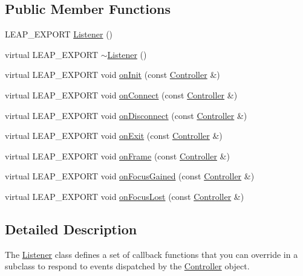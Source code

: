 \subsection*{Public Member Functions}
\begin{DoxyCompactItemize}
\item 
L\+E\+A\+P\+\_\+\+E\+X\+P\+O\+R\+T \hyperlink{class_leap_1_1_listener_a68f2cc4c80510c7f0bb47d1f576ffea9}{Listener} ()
\item 
virtual L\+E\+A\+P\+\_\+\+E\+X\+P\+O\+R\+T \hyperlink{class_leap_1_1_listener_a11a24ce72b609c45ec7010a3cb460d49}{$\sim$\+Listener} ()
\item 
virtual L\+E\+A\+P\+\_\+\+E\+X\+P\+O\+R\+T void \hyperlink{class_leap_1_1_listener_a180d621ad08afa5851d03d3546a82bbf}{on\+Init} (const \hyperlink{class_leap_1_1_controller}{Controller} \&)
\item 
virtual L\+E\+A\+P\+\_\+\+E\+X\+P\+O\+R\+T void \hyperlink{class_leap_1_1_listener_adfef79f9a03b342384aaa17f3a8ebf15}{on\+Connect} (const \hyperlink{class_leap_1_1_controller}{Controller} \&)
\item 
virtual L\+E\+A\+P\+\_\+\+E\+X\+P\+O\+R\+T void \hyperlink{class_leap_1_1_listener_ac031e2d95b530097e2060518a9190f5e}{on\+Disconnect} (const \hyperlink{class_leap_1_1_controller}{Controller} \&)
\item 
virtual L\+E\+A\+P\+\_\+\+E\+X\+P\+O\+R\+T void \hyperlink{class_leap_1_1_listener_ac8f779a9208101f0084953560923f88c}{on\+Exit} (const \hyperlink{class_leap_1_1_controller}{Controller} \&)
\item 
virtual L\+E\+A\+P\+\_\+\+E\+X\+P\+O\+R\+T void \hyperlink{class_leap_1_1_listener_ab600421108bbc952d8f0f144384ca30f}{on\+Frame} (const \hyperlink{class_leap_1_1_controller}{Controller} \&)
\item 
virtual L\+E\+A\+P\+\_\+\+E\+X\+P\+O\+R\+T void \hyperlink{class_leap_1_1_listener_ab52aa99ad9e8fd0f35d9dffc3ef9f027}{on\+Focus\+Gained} (const \hyperlink{class_leap_1_1_controller}{Controller} \&)
\item 
virtual L\+E\+A\+P\+\_\+\+E\+X\+P\+O\+R\+T void \hyperlink{class_leap_1_1_listener_a7bcae44a40674c3f1e367b911201d252}{on\+Focus\+Lost} (const \hyperlink{class_leap_1_1_controller}{Controller} \&)
\end{DoxyCompactItemize}


\subsection{Detailed Description}
The \hyperlink{class_leap_1_1_listener}{Listener} class defines a set of callback functions that you can override in a subclass to respond to events dispatched by the \hyperlink{class_leap_1_1_controller}{Controller} object.

